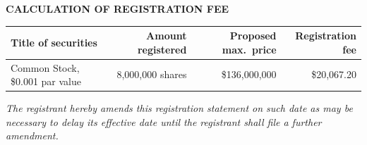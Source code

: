 \documentclass[10pt]{article}
\begin{document}
\vspace{4pt}
{\centering\bfseries CALCULATION OF REGISTRATION FEE\par}
\vspace{2pt}
\begin{tabularx}{\linewidth}{@{}X R R R@{}}
\toprule
\textbf{Title of securities} & \textbf{Amount registered} &
\textbf{Proposed max.\ price} & \textbf{Registration fee}\\
\midrule
Common Stock, \$0.001 par value & 8,000,000 shares & \$136,000,000 & \$20,067.20\\
\bottomrule
\end{tabularx}

\begin{center}\footnotesize\itshape
The registrant hereby amends this registration statement on such date as may be necessary
to delay its effective date until the registrant shall file a further amendment.
\end{center}

\vspace{4pt}{\color{rule}\rule{\linewidth}{1.2pt}}






\end{document}
